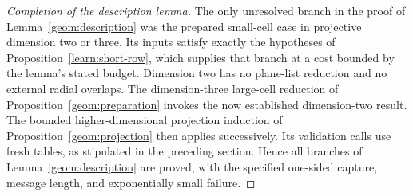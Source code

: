 \begin{proof}[Completion of the description lemma]
\label{learn:completion}
The only unresolved branch in the proof of
Lemma~\ref{geom:description} was the prepared small-cell case in
projective dimension two or three. Its inputs satisfy exactly the
hypotheses of Proposition~\ref{learn:short-row}, which supplies that
branch at a cost bounded by the lemma's stated budget. Dimension
two has no plane-list reduction and no external radial overlaps.
The dimension-three large-cell reduction of
Proposition~\ref{geom:preparation} invokes the now established
dimension-two result. The bounded higher-dimensional projection
induction of Proposition~\ref{geom:projection} then applies successively.
Its validation calls use fresh
tables, as stipulated in the preceding section. Hence all branches
of Lemma~\ref{geom:description} are proved, with the specified
one-sided capture, message length, and exponentially small failure.
\end{proof}
